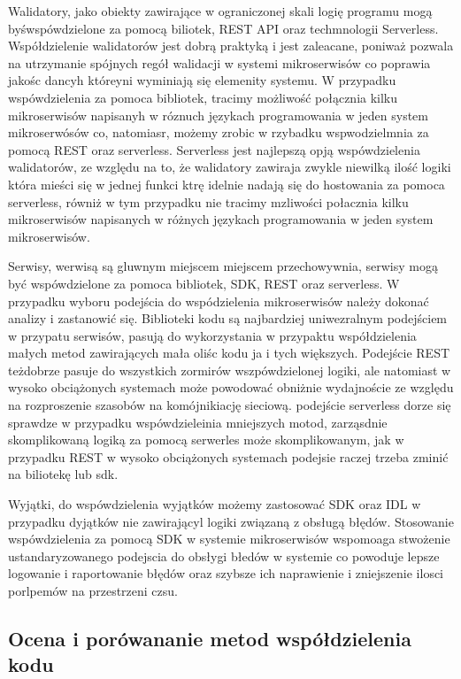\documentclass[runningheads,12pt]{llncs}
\begin{document}
Walidatory, jako obiekty zawirające w ograniczonej skali logię programu mogą byśwspówdzielone za pomocą biliotek, REST API oraz techmnologii Serverless. Współdzielenie walidatorów jest dobrą praktyką i jest zaleacane, poniważ pozwala na utrzymanie spójnych regół walidacji w systemi mikroserwisów co poprawia jakośc dancyh któreyni wyminiają się elemenity systemu. W przypadku wspówdzielenia za pomoca bibliotek, tracimy możliwość połącznia kilku mikroserwisów napisanyh w róznuch językach programowania w jeden system mikroserwósów co, natomiasr, możemy zrobic w rzybadku wspwodzielmnia za pomocą REST oraz serverless. Serverless jest najlepszą opją wspówdzielenia walidatorów, ze względu na to, że walidatory zawiraja zwykle niewilką ilość logiki która mieści się w jednej funkci ktrę idelnie nadają się do hostowania za pomoca serverless, równiż w tym przypadku nie tracimy mzliwości połacznia kilku mikroserwisów napisanych w różnych językach programowania w jeden system mikroserwisów.

Serwisy, werwisą są gluwnym miejscem miejscem przechowywnia, serwisy mogą być wspówdzielone za pomoca bibliotek, SDK, REST oraz serverless. W przypadku wyboru podejścia do wspódzielenia mikroserwisów należy dokonać analizy i zastanowić się. Biblioteki kodu są najbardziej uniwezralnym podejściem w przypatu serwisów, pasują do wykorzystania w przypaktu współdzielenia małych metod zawirających mała oliśc kodu ja i tych większych. Podejście REST teżdobrze pasuje do wszystkich zormirów wszpówdzielonej logiki, ale natomiast w wysoko obciążonych systemach może powodować obniżnie wydajnoście ze względu na rozproszenie szasobów na komójnikiację sieciową. podejście serverless dorze się sprawdze w przypadku wspówdzieleinia mniejszych motod, zarząsdnie skomplikowaną logiką za pomocą serwerles może skomplikowanym, jak w przypadku REST w wysoko obciążonych systemach podejsie raczej trzeba zminić na biliotekę lub sdk.

Wyjątki, do wspówdzielenia wyjątków możemy zastosować SDK oraz IDL w przypadku dyjątków nie zawirającyl logiki związaną z obsługą błędów. Stosowanie wspówdzielenia za pomocą SDK w systemie mikroserwisów wspomoaga stwożenie ustandaryzowanego podejscia do obsłygi błedów w systemie co powoduje lepsze logowanie i raportowanie błędów oraz szybsze ich naprawienie i zniejszenie ilosci porlpemów na przestrzeni czsu.

\subsection{Ocena i porówananie metod współdzielenia kodu}
\end{document}
